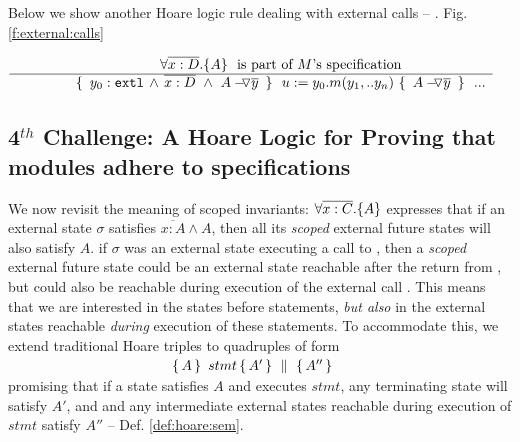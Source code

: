  {Below we show another   Hoare logic rule %
dealing with external calls -- \cf. Fig.\ref{f:external:calls} }
 
 $\inferruleNoName  
 	{ 
   	   {\TwoStatesN {\overline {x:D}} {A}}\ \   \mbox{is part of $M$'s specification}
        }
	{   \triple { \    { \external{y_0}} \,     \wedge \,  \overline{x:D}\  \wedge\  {\PushAS {y}{A}}\ }  
						{ \ u:=y_0.m(y_1,.. y_n)\    }
						{ \    {\PushAS {y}{A}}  \ }
						\  \  ...
         }
$

 
 
 
   \subsection{4$^{th}$ Challenge: A Hoare Logic for Proving that modules adhere to specifications} %

 We now revisit the meaning of scoped invariants: 
  {$\forall {\overline{x:C}}.{{\{}}{A}{{\}}}$} expresses that if an external {state} $\sigma$ 
 satisfies $\overline {x:A} \wedge A$, then all its \emph{scoped} external future  states will  {also} satisfy  {$A$}. 
\Eg if $\sigma$ was an external state executing a call to , then a \emph{scoped} external future  state
 could be an external state reachable 
after the return from , but could also be reachable
during execution of the external call .
This means that we are  interested in the states before %
statements, \emph{but  also}  in the external states reachable \emph{during} execution of these statements. 
To accommodate this, we extend   traditional Hoare triples to quadruples of  form\\
 $\strut \ \hspace{4cm} \quadruple {A} {\, stmt\, }{A'} {A''}$\\  
 promising that if a state satisfies $A$ and executes $stmt$, any terminating state will satisfy $A'$, and 
 and  any intermediate external states reachable during execution of $stmt$ satisfy    $A''$ -- \cf Def. \ref{def:hoare:sem}.

\vspace{.05cm}

